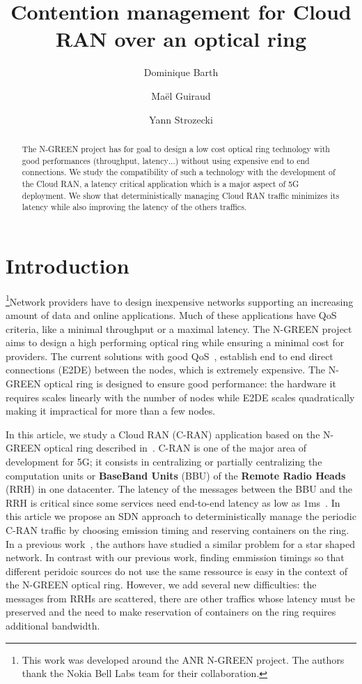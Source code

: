 \documentclass[]{llncs}
\title{Contention management for Cloud RAN over an optical ring}
\author{Dominique Barth \inst{1}
  \and Ma\"el Guiraud \inst{1}
   \and Yann Strozecki \inst{1}
  }
\institute{David Laboratory, UVSQ}
\begin{document}
\maketitle


\begin{abstract}
The N-GREEN project has for goal to design a low cost optical ring technology with good performances (throughput, latency$\dots$) without using expensive end to end connections. We study the compatibility of such a technology with the development of the Cloud RAN, a latency critical application which is a major aspect of 5G deployment. We show that deterministically managing Cloud RAN traffic minimizes its latency while also improving the latency of the others traffics. 
\end{abstract}


\section{Introduction}

\footnote{This work was developed around the ANR N-GREEN project. The authors thank the Nokia Bell Labs team for their collaboration.}Network providers have to design inexpensive networks supporting an increasing amount of data and online applications. Much of these applications have QoS criteria, like a minimal throughput or a maximal latency. The N-GREEN project aims to design a high performing optical ring while ensuring a minimal cost for providers. The current solutions with good QoS~\cite{pizzinat2015things,tayq2017real}, establish end to end direct connections (E2DE) between the nodes, which is extremely expensive. The N-GREEN optical ring is designed to ensure good performance: the hardware it requires scales linearly with the number of nodes while E2DE scales quadratically making it impractical for more than a few nodes.

In this article, we study a Cloud RAN (C-RAN) application based on the N-GREEN optical ring described in~\cite{ngreenarchitecture,uscumlicscalable}. C-RAN is one of the major area of development for 5G; it consists in centralizing or partially centralizing the computation units or {\bf BaseBand Units} (BBU) of the {\bf Remote Radio Heads} (RRH) in one datacenter. The latency of the messages between the BBU and the RRH is critical since some services need end-to-end latency as low as $1$ms~\cite{3gpp5g,boccardi2014five}. In this article we propose an SDN approach to deterministically manage the periodic C-RAN traffic by choosing emission timing and reserving containers on the ring. In a previous work~\cite{dominique2018deterministic}, the authors have studied a similar problem for a star shaped network. In contrast with our previous work, finding emmission timings so that different peridoic sources do not use the same ressource is easy in the context of the N-GREEN optical ring. However, we add several new difficulties: the messages from RRHs are scattered, there are other traffics whose latency must be preserved and the need to make reservation of containers on the ring requires additional bandwidth.
\end{document}
